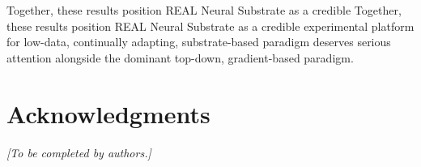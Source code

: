 \documentclass[10pt,twocolumn]{article}
\begin{document}
Together, these results position REAL Neural Substrate as a credible
Together, these results position REAL Neural Substrate as a credible
experimental platform for low-data, continually adapting, substrate-based
paradigm deserves serious attention alongside the dominant top-down,
gradient-based paradigm.

\section*{Acknowledgments}
\textit{[To be completed by authors.]}




\end{document}
